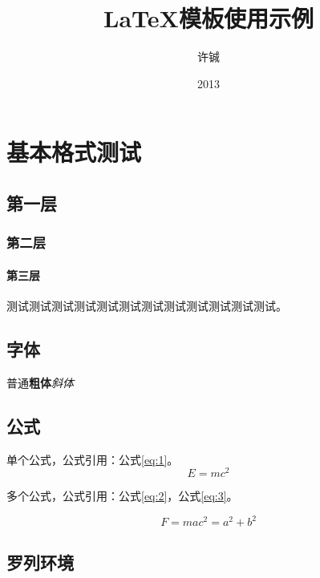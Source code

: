 \documentclass[format=draft,degree=bachelor]{hustthesis}
\title{\LaTeX 模板使用示例}{An Example of Using hustthesis \LaTeX{} Template}
\author{许铖}{Xu Cheng}
\date{2013}{4}{1}
\begin{document}
\frontmatter
\maketitle
\makeabstract
\tableofcontents
\listoffigures
\listoftables
\mainmatter

\chapter{基本格式测试}

\section{第一层}
\subsection{第二层}
\subsubsection{第三层}
测试测试测试测试测试测试测试测试测试测试测试测试。

\section{字体}

普通\textbf{粗体}\emph{斜体}


\section{公式}

单个公式，公式引用：公式\ref{eq:1}。
\begin{equation}
  E = mc^2 \label{eq:1}
\end{equation}

多个公式，公式引用：公式\ref{eq:2}，公式\ref{eq:3}。

\begin{subequations}
\begin{equation}
  F = ma \label{eq:2}
\end{equation}
\begin{equation}
  c^2 = a^2 + b^2 \label{eq:3}
\end{equation}
\end{subequations}

\section{罗列环境}
\end{document}
